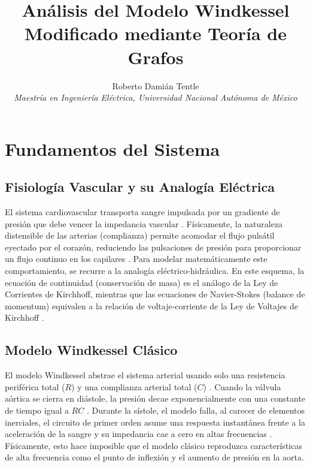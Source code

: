\documentclass[journal,10pt]{IEEEtran}
\begin{document}
\title{Análisis del Modelo Windkessel Modificado mediante Teoría de Grafos}
\author{Roberto Damián Tentle\\
\textit{Maestría en Ingeniería Eléctrica, 
Universidad Nacional Autónoma de México}}
\maketitle

\begin{abstract}

\end{abstract}

\section{Fundamentos del Sistema}
\subsection{Fisiología Vascular y su Analogía Eléctrica}
El sistema cardiovascular transporta sangre impulsada por 
un gradiente de presión que debe vencer la impedancia vascular \cite{shi2011}.
Físicamente, la naturaleza distensible de las arterias (complianza) permite 
acomodar el flujo pulsátil eyectado por el corazón, reduciendo las pulsaciones 
de presión para proporcionar un flujo continuo en los capilares \cite{hall2021guyton}.
Para modelar matemáticamente este comportamiento, se recurre a la analogía eléctrico-hidráulica. 
En este esquema, la ecuación de continuidad (conservación de masa) es el análogo de la Ley 
de Corrientes de Kirchhoff, mientras que las ecuaciones de Navier-Stokes (balance de momentum) 
equivalen a la relación de voltaje-corriente de la Ley de Voltajes de Kirchhoff \cite{hall2021guyton}.
\subsection{Modelo Windkessel Clásico}
El modelo Windkessel abstrae el sistema arterial usando solo una resistencia periférica total ($R$) 
y una complianza arterial total ($C$) \cite{westerhof2009}. Cuando la válvula aórtica se cierra en diástole,
la presión decae exponencialmente con una constante de tiempo igual a $RC$ \cite{westerhof2009}.
Durante la sístole, el modelo falla, al carecer de elementos inerciales, el circuito de primer orden asume una respuesta instantánea frente a 
la aceleración de la sangre y su impedancia cae a cero en altas frecuencias \cite{westerhof2009}. 
Físicamente, esto hace imposible que el modelo clásico reproduzca características de alta frecuencia como el punto 
de inflexión y el aumento de presión en la aorta.
\end{document}
